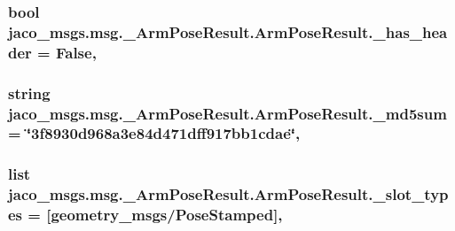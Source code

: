 \subsubsection[{\texorpdfstring{\+\_\+has\+\_\+header}{_has_header}}]{\setlength{\rightskip}{0pt plus 5cm}bool jaco\+\_\+msgs.\+msg.\+\_\+\+Arm\+Pose\+Result.\+Arm\+Pose\+Result.\+\_\+has\+\_\+header = False\hspace{0.3cm}{\ttfamily [static]}, {\ttfamily [private]}}\hypertarget{classjaco__msgs_1_1msg_1_1__ArmPoseResult_1_1ArmPoseResult_a5700cf580a06a534210e6b74a41468b7}{}\label{classjaco__msgs_1_1msg_1_1__ArmPoseResult_1_1ArmPoseResult_a5700cf580a06a534210e6b74a41468b7}
\subsubsection[{\texorpdfstring{\+\_\+md5sum}{_md5sum}}]{\setlength{\rightskip}{0pt plus 5cm}string jaco\+\_\+msgs.\+msg.\+\_\+\+Arm\+Pose\+Result.\+Arm\+Pose\+Result.\+\_\+md5sum = \char`\"{}3f8930d968a3e84d471dff917bb1cdae\char`\"{}\hspace{0.3cm}{\ttfamily [static]}, {\ttfamily [private]}}\hypertarget{classjaco__msgs_1_1msg_1_1__ArmPoseResult_1_1ArmPoseResult_a39a6952d01b43d62b16315cc27cb8988}{}\label{classjaco__msgs_1_1msg_1_1__ArmPoseResult_1_1ArmPoseResult_a39a6952d01b43d62b16315cc27cb8988}
\subsubsection[{\texorpdfstring{\+\_\+slot\+\_\+types}{_slot_types}}]{\setlength{\rightskip}{0pt plus 5cm}list jaco\+\_\+msgs.\+msg.\+\_\+\+Arm\+Pose\+Result.\+Arm\+Pose\+Result.\+\_\+slot\+\_\+types = \mbox{[}\textquotesingle{}geometry\+\_\+msgs/Pose\+Stamped\textquotesingle{}\mbox{]}\hspace{0.3cm}{\ttfamily [static]}, {\ttfamily [private]}}\hypertarget{classjaco__msgs_1_1msg_1_1__ArmPoseResult_1_1ArmPoseResult_a6325d8d1d310280ededa87406216a7b4}{}\label{classjaco__msgs_1_1msg_1_1__ArmPoseResult_1_1ArmPoseResult_a6325d8d1d310280ededa87406216a7b4}


